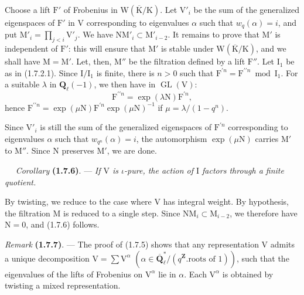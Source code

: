 \documentclass[11pt,leqno]{article}
\newcommand{\Page}[1]{\ifvmode\noindent\else\unskip\ \fi{\footnotesize\textcolor{gray}{[p.\,#1]}}\ \ignorespaces}
\begin{document}
Choose a lift \(\mathrm{F}'\) of Frobenius in \(\mathrm{W}(\overline{\mathrm{K}}/\mathrm{K})\). Let \(\mathrm{V}'_i\) be the sum of the generalized eigenspaces of \(\mathrm{F}'\) in \(\mathrm{V}\) corresponding to eigenvalues \(\alpha\) such that \(w_q(\alpha)=i\), and put \(\mathrm{M}'_i=\prod\limits_{j<i}\mathrm{V}'_j\). We have \(\mathrm{N}\mathrm{M}'_i\subset\mathrm{M}'_{i-2}\). It remains to prove that \(\mathrm{M}'\) is independent of \(\mathrm{F}'\): this will ensure that \(\mathrm{M}'\) is stable under \(\mathrm{W}(\overline{\mathrm{K}}/\mathrm{K})\), and we shall have \(\mathrm{M}=\mathrm{M}'\). Let, then, \(\mathrm{M}''\) be the filtration defined by a lift \(\mathrm{F}''\). Let \(\mathrm{I}_1\) be as in (1.7.2.1). Since \(\mathrm{I}/\mathrm{I}_1\) is finite, there is \(n>0\) such that \(\mathrm{F}^{\prime n}=\mathrm{F}^{\prime\prime n}\bmod\mathrm{I}_1\). For a suitable \(\lambda\) in \(\mathbf{Q}_\ell(-1)\), we then have in \(\operatorname{GL}(\mathrm{V})\):
\[
\mathrm{F}^{\prime\prime n}=\exp(\lambda\mathrm{N})\mathrm{F}^{\prime n},
\]
hence \(\mathrm{F}^{\prime\prime n}=\exp(\mu\mathrm{N})\mathrm{F}^{\prime n}\exp(\mu\mathrm{N})^{-1}\) if \(\mu=\lambda/(1-q^n)\).

Since \(\mathrm{V}'_i\) is still the sum of the generalized eigenspaces of \(\mathrm{F}^{\prime n}\) corresponding to eigenvalues \(\alpha\) such that \(w_{q^n}(\alpha)=i\), the automorphism \(\exp(\mu\mathrm{N})\) carries \(\mathrm{M}'\) to \(\mathrm{M}''\). Since \(\mathrm{N}\) preserves \(\mathrm{M}'\), we are done.

\Page{172}
\textit{Corollary} \textbf{(1.7.6)}. — \textit{If \(\mathrm{V}\) is \(\iota\)-pure, the action of \(\mathrm{I}\) factors through a finite quotient.}

By twisting, we reduce to the case where \(\mathrm{V}\) has integral weight. By hypothesis, the filtration \(\mathrm{M}\) is reduced to a single step. Since \(\mathrm{N}\mathrm{M}_i\subset\mathrm{M}_{i-2}\), we therefore have \(\mathrm{N}=0\), and (1.7.6) follows.

\textit{Remark} \textbf{(1.7.7)}. — The proof of (1.7.5) shows that any representation \(\mathrm{V}\) admits a unique decomposition \(\mathrm{V}=\sum\mathrm{V}^{\alpha}\) \((\alpha\in\overline{\mathbf{Q}}_\ell^*/(q^{\mathbf{Z}}.\text{roots of }1))\), such that the eigenvalues of the lifts of Frobenius on \(\mathrm{V}^{\alpha}\) lie in \(\alpha\). Each \(\mathrm{V}^{\alpha}\) is obtained by twisting a mixed representation.
\end{document}
